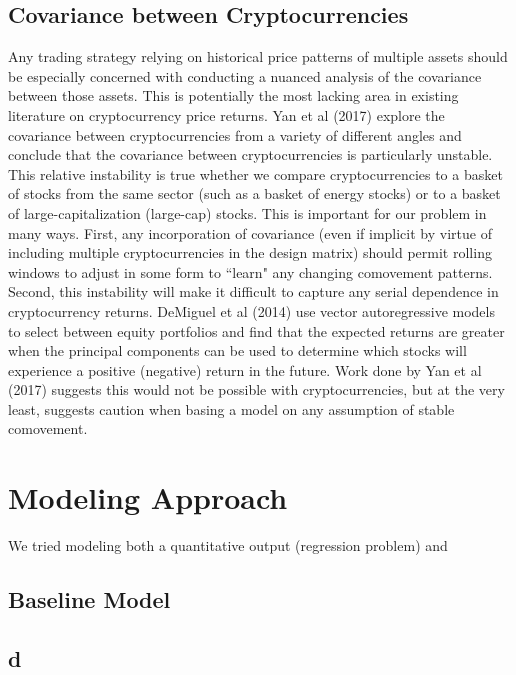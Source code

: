 \documentclass[12pt,twoside]{article}
\begin{document}
\subsection{Covariance between Cryptocurrencies}
Any trading strategy relying on historical price patterns of multiple assets should be especially concerned with conducting a nuanced analysis of the covariance between those assets. This is potentially the most lacking area in existing literature on cryptocurrency price returns. Yan et al (2017) explore the covariance between cryptocurrencies from a variety of different angles and conclude that the covariance between cryptocurrencies is particularly unstable. This relative instability is true whether we compare cryptocurrencies to a basket of stocks from the same sector (such as a basket of energy stocks) or to a basket of large-capitalization (large-cap) stocks. This is important for our problem in many ways. First, any incorporation of covariance (even if implicit by virtue of including multiple cryptocurrencies in the design matrix) should permit rolling windows to adjust in some form to ``learn" any changing comovement patterns. Second, this instability will make it difficult to capture any serial dependence in cryptocurrency returns. DeMiguel et al (2014) use vector autoregressive models to select between equity portfolios and find that the expected returns are greater when the principal components can be used to determine which stocks will experience a positive (negative) return in the future. Work done by Yan et al (2017) suggests this would not be possible with cryptocurrencies, but at the very least, suggests caution when basing a model on any assumption of stable comovement.

\section{Modeling Approach}



We tried modeling both a quantitative output (regression problem) and 

\subsection{Baseline Model}

\subsection{d}
\end{document}
